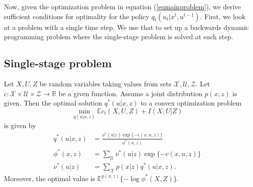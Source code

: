 Now, given the optimization problem in equation (\ref{eqmainproblem}), we derive sufficient conditions for optimality for the policy $q_t(u_t|x^t,u^{t-1})$. First, we look at a problem with a single time step. We use that to set up a backwards dynamic programming problem where the single-stage problem is solved at each step.
\vspace{-0.25cm}
\subsection{Single-stage problem}

\label{secsinglestage}
Let $X, U, Z$ be random variables taking values from sets $\mathcal{X}, \mathcal{U}, \mathcal{Z}$.
Let $c:\mathcal{X}\times \mathcal{U}\times \mathcal{Z}\rightarrow \mathbb{R}$ be a given function. 
Assume a joint distribution $p(x,z)$ is given.
Then the optimal solution $q^*(u|x, z)$ to a convex optimization problem
\[
\min_{q(u|x,z)} \mathbb{E}c_t(X,U,Z)+I(X;U|Z)
\]
is given by \cite{csiszar1974extremum}
\begin{align*}
q^*(u|x,z)&=\frac{\nu^*(u|z)\exp\{-c(x,u,z)\}}{\phi^*(x,z)} \\
\phi^*(x,z)&=\sum_{\mathcal{U}} \nu^*(u|z)\exp\{-c(x,u,z)\} \\
\nu^*(u|z)&=\sum_{\mathcal{X}} p(x|z)q^*(u|x,z).
\end{align*}
Moreover, the optimal value is $\mathbb{E}^{p(x,z)}\{-\log \phi^*(X,Z)\}$.

